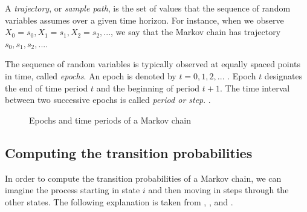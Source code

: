 A \textit{trajectory}, or \textit{sample path}, is the set of values that the sequence of random variables assumes over a given time horizon. For instance, when we observe $X_0 = s_0, X_1 = s_1, X_2 = s_2, ...$, we say that the Markov chain has trajectory $s_0, s_1, s_2,...$. 

The sequence of random variables is typically observed at equally spaced points in time, called 
\textit{epochs}. An epoch is denoted by $t = 0, 1, 2, ...$ . Epoch $t$ designates the end of time period $t$ and the beginning of period $t + 1$. The time interval between two successive epochs is called \textit{period or step}. \citep{Sheskin2010}.\\


\begin{figure}[H]
\centering
{}
\caption{Epochs and time periods of a Markov chain}
\label{fig:markov_chain}
\end{figure}


\subsection{Computing the transition probabilities}
In order to compute the transition probabilities of a Markov chain, we can imagine the process starting in state $i$ and then moving in steps through the other states. The following explanation is taken from \cite{Sheskin2010}, \cite{Howard1960}, and \cite{Holmes2015}. \\

